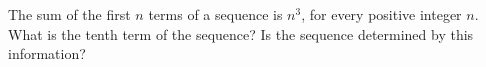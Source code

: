 The sum of the first $n$ terms of a sequence is $n^3$, for every positive integer $n$. What is the tenth term of the sequence? Is the sequence determined by this information?
